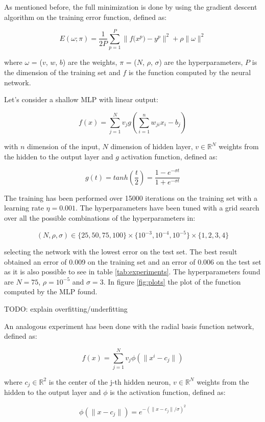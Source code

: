 \documentclass[a4paper]{article}
\numberwithin{equation}{section} %
\numberwithin{figure}{section} %
\numberwithin{table}{section} %
\theoremstyle{definition}
\begin{document}
As mentioned before, the full minimization is done by using the gradient
descent algorithm on the training error function, defined as:

\[ E(\omega; \pi) = \frac{1}{2P} \displaystyle\sum_{p=1}^{P} \| f\big(x^p\big) - y^p \|^2
+ \rho \| \omega \|^2 \]

\noindent where $\omega$ = ($v$, $w$, $b$) are the weights,
$\pi$ = ($N$, $\rho$, $\sigma$) are the hyperparameters, $P$ is the dimension
of the training set and $f$ is the function computed by the neural network.

Let's consider a shallow MLP with linear output:

\[ f(x) = \displaystyle\sum_{j=1}^{N} v_j g\left(\displaystyle\sum_{i=1}^{n}w_{ji}x_i - b_j\right) \]

\noindent with $n$ dimension of the input, $N$ dimension of hidden layer, $v \in \mathbb{R}^N$
weights from the hidden to the output layer and
$g$ activation function, defined as:

\[ g(t) = tanh\left(\frac{t}{2}\right) = \frac{1-e^{-\sigma t}}{1+e^{-\sigma t}} \]

The training has been performed over 15000 iterations on the training set with
a learning rate $\eta = 0.001$. The hyperparameters have been tuned with a
grid search over all the possible combinations of the hyperparameters in:

\[ (N, \rho, \sigma) \in \Big\{25, 50, 75, 100\Big\} \times \Big\{10^{-3}, 10^{-4}, 10^{-5}\Big\}
\times \Big\{1, 2, 3, 4\Big\} \]

\noindent selecting the network with the lowest error on the test set.
The best result obtained an error of 0.009 on the training set and an error of
0.006 on the test set as it is also possible to see in table \ref{tab:experiments}.
The hyperparameters found are $N=75$, $\rho=10^{-5}$ and $\sigma=3$. In figure \ref{fig:plots}
the plot of the function computed by the MLP found.

TODO: explain overfitting/underfitting

An analogous experiment has been done with the radial basis function network,
defined as:

\[ f(x) = \displaystyle\sum_{j=1}^{N} v_j \phi(\| x^i - c_j \|) \]

where $c_j \in \mathbb{R}^2$ is the center of the j-th hidden neuron,
$v \in \mathbb{R}^N$ weights from the hidden to the output layer and $\phi$
is the activation function, defined as:

\[ \phi(\|x - c_j\|) = e^{-(\| x - c_j \|/\sigma)^2} \]
\end{document}
